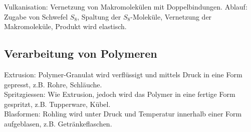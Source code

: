Vulkanisation: Vernetzung von Makromolekülen mit Doppelbindungen. Ablauf: Zugabe von Schwefel $S_8$, Spaltung der $S_8$-Moleküle, Vernetzung der Makromoleküle, Produkt wird elastisch. 

\subsection{Verarbeitung von Polymeren}
Extrusion: Polymer-Granulat wird verflüssigt und mittels Druck in eine Form gepresst, z.B. Rohre, Schläuche. \\

Spritzgiessen: Wie Extrusion, jedoch wird das Polymer in eine fertige Form gespritzt, z.B. Tupperware, Kübel. \\

Blasformen: Rohling wird unter Druck und Temperatur innerhalb einer Form aufgeblasen, z.B. Getränkeflaschen. \\
